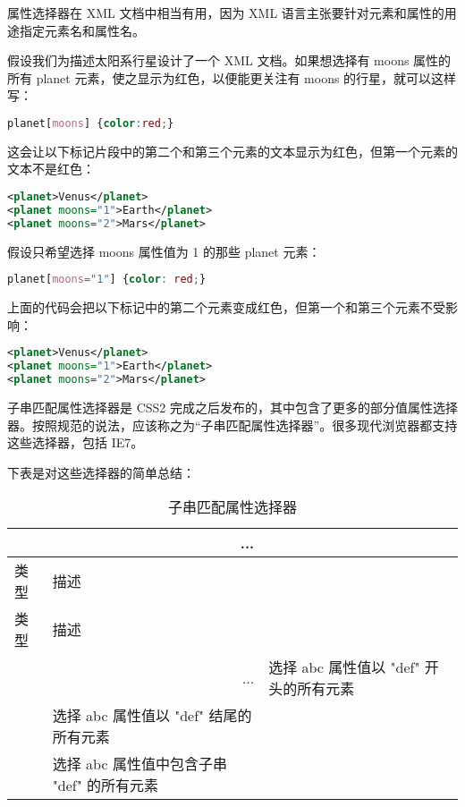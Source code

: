 属性选择器在 XML 文档中相当有用，因为 XML 语言主张要针对元素和属性的用途指定元素名和属性名。

假设我们为描述太阳系行星设计了一个 XML 文档。如果想选择有 moons 属性的所有 planet 元素，使之显示为红色，以便能更关注有 moons 的行星，就可以这样写：

\begin{lstlisting}[language=CSS]
planet[moons] {color:red;}
\end{lstlisting}

这会让以下标记片段中的第二个和第三个元素的文本显示为红色，但第一个元素的文本不是红色：

\begin{lstlisting}[language=XML]
<planet>Venus</planet>
<planet moons="1">Earth</planet>
<planet moons="2">Mars</planet>
\end{lstlisting}

假设只希望选择 moons 属性值为 1 的那些 planet 元素：

\begin{lstlisting}[language=CSS]
planet[moons="1"] {color: red;}
\end{lstlisting}

上面的代码会把以下标记中的第二个元素变成红色，但第一个和第三个元素不受影响：

\begin{lstlisting}[language=XML]
<planet>Venus</planet>
<planet moons="1">Earth</planet>
<planet moons="2">Mars</planet>
\end{lstlisting}


子串匹配属性选择器是 CSS2 完成之后发布的，其中包含了更多的部分值属性选择器。按照规范的说法，应该称之为“子串匹配属性选择器”。很多现代浏览器都支持这些选择器，包括 IE7。

下表是对这些选择器的简单总结：


\begin{longtable}{|p{80pt}|p{200pt}|}
\multicolumn{2}{r}{...}
\tabularnewline\hline
类型	&	描述
\endhead

\caption{子串匹配属性选择器}\\
\hline
类型	&描述
\tabularnewline\hline
\endfirsthead


\multicolumn{2}{r}{...}
\endfoot

\endlastfoot

\hline
[abc\^{}="def"]	&选择 abc 属性值以 "def" 开头的所有元素\\
\hline
[abc\$="def"]	&选择 abc 属性值以 "def" 结尾的所有元素\\
\hline
[abc*="def"]	&选择 abc 属性值中包含子串 "def" 的所有元素\\
\hline

\end{longtable}



